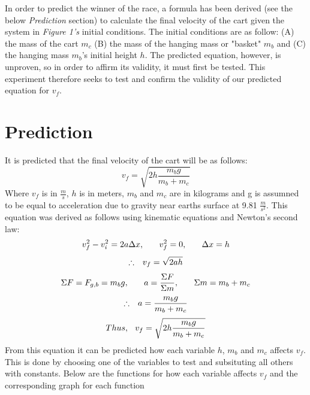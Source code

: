 \documentclass[12pt,letterpaper]{article}
\begin{document}
\newpage%
In order to predict the winner of the race, a formula has been derived (see the below \textit{Prediction} section) to calculate the final velocity of the cart given the system in \textit{Figure 1's} initial conditions. The initial conditions are as follow: (A) the mass of the cart \(m_c\) (B) the mass of the hanging mass or "basket" \(m_b\) and (C) the hanging mass \(m_b\)'s initial height \(h\). The predicted equation, however, is unproven, so in order to affirm its validity, it must first be tested. This experiment therefore seeks to test and confirm the validity of our predicted equation for \(v_f\).
\section{Prediction}
It is predicted that the final velocity of the cart will be as follows:
\begin{equation}
v_f = \sqrt{2h\frac{m_b g}{m_b + m_c}} 
\end{equation}
Where \(v_f\) is in \(\frac{m}{s}\), \(h\) is in meters, \(m_b\) and \(m_c\) are in kilograms and g is assumned to be equal to acceleration due to gravity near earths surface at 9.81 \(\frac{m}{s^2}\). This equation was derived as follows using kinematic equations and Newton's second law:
\begin{equation}
v_f^2 - v_i^2 = 2 a \Delta x, \hspace{0.25in} v_f^2 = 0, \hspace{0.25in} \Delta x = h  
\end{equation}
\begin{equation}
\therefore \hspace{0.1in} v_f = \sqrt{2ah}
\end{equation}
\begin{equation}
\Sigma F = F_{g,b} = m_b g, \hspace{0.25in} a = \frac{\Sigma F}{\Sigma m}, \hspace{0.25 in} \Sigma m = m_b + m_c
\end{equation}
\begin{equation}
\therefore \hspace{0.1in} a = \frac{m_b g}{m_b + m_c} 
\end{equation}
\begin{equation}
Thus,\hspace{0.1in} v_f =\sqrt{2h \frac{m_b g}{m_b + m_c}} 
\end{equation}
From this equation it can be predicted how each variable \(h\), \(m_b\) and \(m_c\) affects \(v_f\). This is done by choosing one of the variables to test and subsituting all others with constants. Below are the  functions for how each variable affects \(v_f\) and the corresponding graph for each function
\end{document}
